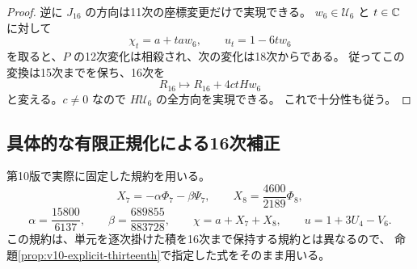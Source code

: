 \begin{proof}
逆に $J_{16}$ の方向は11次の座標変更だけで実現できる。
$w_6\in\mathcal U_6$ と $t\in\mathbb C$ に対して
\[
 \chi_t=a+taw_6,\qquad u_t=1-6tw_6
\]
を取ると、$P$ の12次変化は相殺され、次の変化は18次からである。
従ってこの変換は15次までを保ち、16次を
\[
 R_{16}\longmapsto R_{16}+4ctHw_6
\]
と変える。$c\ne0$ なので $H\mathcal U_6$ の全方向を実現できる。
これで十分性も従う。
\end{proof}

\subsection{具体的な有限正規化による16次補正}
\label{subsec:v13-sixteenth-correction}

第10版で実際に固定した規約を用いる。
\[
 X_7=-\alpha\Phi_7-\beta\Psi_7,\qquad
 X_8=\frac{4600}{2189}\Phi_8,
\]
\[
 \alpha=\frac{15800}{6137},\qquad
 \beta=\frac{689855}{883728},\qquad
 \chi=a+X_7+X_8,\qquad u=1+3U_4-V_6.
\]
この規約は、単元を逐次掛けた積を16次まで保持する規約とは異なるので、
命題\ref{prop:v10-explicit-thirteenth}で指定した式をそのまま用いる。


